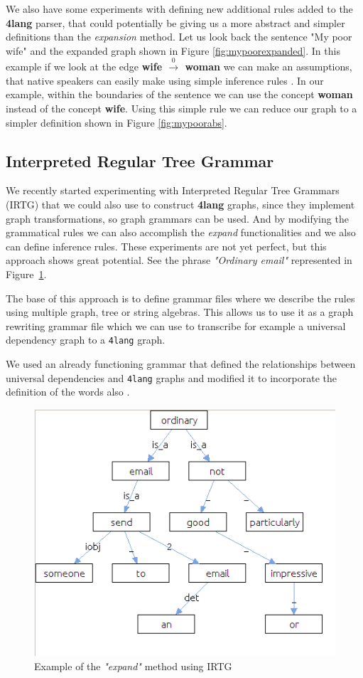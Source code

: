 We also have some experiments with defining new additional rules added to the \textbf{4lang} parser, that could potentially be giving us a more abstract and simpler definitions than the \textit{expansion} method. Let us look back the sentence "My poor wife" and the expanded graph shown in Figure \ref{fig:mypoorexpanded}. In this example if we look at the edge \textbf{wife $\xrightarrow0$ woman} we can make an assumptions, that native speakers can easily make using simple inference rules \cite{Kovacs:2018}. In our example, within the boundaries of the sentence we can use the concept \textbf{woman} instead of the concept \textbf{wife}. Using this simple rule we can reduce our graph to a simpler definition shown in Figure \ref{fig:mypoorabs}.

\subsection{Interpreted Regular Tree Grammar}
We recently started experimenting with Interpreted Regular Tree Grammars \cite{Koller:2011} (IRTG) that we could also use to construct \textbf{4lang} graphs, since they implement graph transformations, so graph grammars can be used. And by modifying the grammatical rules we can also accomplish the \textit{expand} functionalities and we also can define inference rules. These experiments are not yet perfect, but this approach shows great potential. See the phrase \textit{"Ordinary email"} represented in Figure~\ref{fig:irtg}.

The base of this approach is to define grammar files where we describe the rules using multiple graph, tree or string algebras. This allows us to use it as a graph rewriting grammar file which we can use to transcribe for example a universal dependency graph to a \texttt{4lang} graph.

We used an already functioning grammar that defined the relationships between universal dependencies and \texttt{4lang} graphs and modified it to incorporate the definition of the words also \cite{AcsEvelin:2018}.

\begin{figure}[h]
	\centering
	\includegraphics[scale=0.4]{irtg.jpg}
	\caption{Example of the \textit{"expand"} method using IRTG}
	\label{fig:irtg}
\end{figure}